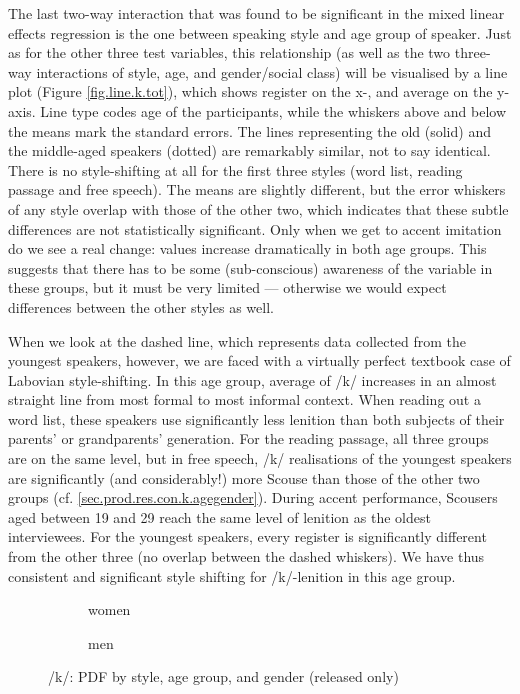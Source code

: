 The last two-way interaction that was found to be significant in the mixed linear effects regression is the one between speaking style and age group of speaker.
Just as for the other three test variables, this relationship (as well as the two three-way interactions of style, age, and gender/social class) will be visualised by a line plot (Figure \ref{fig.line.k.tot}), which shows register on the x-, and average  on the y-axis.
Line type codes age of the participants, while the whiskers above and below the means mark the standard errors.
The lines representing the old (solid) and the middle-aged speakers (dotted) are remarkably similar, not to say identical.
There is no style-shifting at all for the first three styles (word list, reading passage and free speech).
The means are slightly different, but the error whiskers of any style overlap with those of the other two, which indicates that these subtle differences are not statistically significant.
Only when we get to accent imitation do we see a real change:  values increase dramatically in both age groups.
This suggests that there has to be some (sub-conscious) awareness of the variable in these groups, but it must be very limited --- otherwise we would expect differences between the other styles as well.

When we look at the dashed line, which represents data collected from the youngest speakers, however, we are faced with a virtually perfect textbook case of Labovian style-shifting.
In this age group, average  of /k/ increases in an almost straight line from most formal to most informal context.
When reading out a word list, these speakers use significantly less lenition than both subjects of their parents' or grandparents' generation.
For the reading passage, all three groups are on the same level, but in free speech, /k/ realisations of the youngest speakers are significantly (and considerably!) more Scouse than those of the other two groups (cf. \ref{sec.prod.res.con.k.agegender}).
During accent performance, Scousers aged between 19 and 29 reach the same level of lenition as the oldest interviewees.
For the youngest speakers, every register is significantly different from the other three (no overlap between the dashed whiskers).
We have thus consistent and significant style shifting for /k/-lenition in this age group.

\begin{figure}[h]
	\centering
	\begin{subfigure}{.49\textwidth}
		\centering
			\resizebox{\linewidth}{!}{} 
		\caption{women}
		\label{fig.line.k.fem}
	\end{subfigure}
	\begin{subfigure}{.49\textwidth}
		\centering
			\resizebox{\linewidth}{!}{} 
		\caption{men}
		\label{fig.line.k.mal}
	\end{subfigure}
	\caption{/k/: PDF by style, age group, and gender (released only)}
\end{figure}

